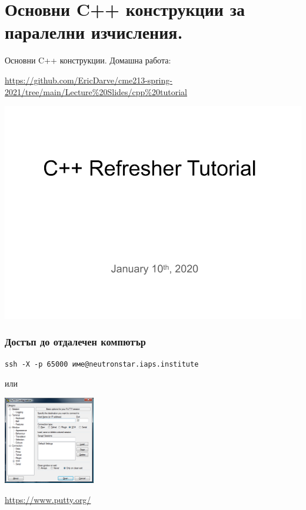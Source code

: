 \documentclass{beamer}
\begin{document}
\section{Основни C++ конструкции за паралелни изчисления.}

\begin{frame}[fragile]{Основни C++ конструкции.}
  Домашна работа:
  
  \url{https://github.com/EricDarve/cme213-spring-2021/tree/main/Lecture%20Slides/cpp%20tutorial}

  \includegraphics[width=\textwidth]{cpp-refresher}
\end{frame}


\begin{frame}[fragile]
  \frametitle{Достъп до отдалечен компютър}

\begin{verbatim}
ssh -X -p 65000 име@neutronstar.iaps.institute
\end{verbatim}

или


\centering
\includegraphics[width=0.3\textwidth]{putty}

  \url{https://www.putty.org/}
\end{frame}
\end{document}
